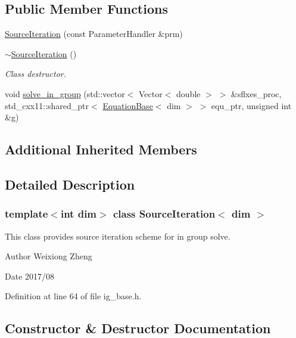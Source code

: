 \subsection*{Public Member Functions}
\begin{DoxyCompactItemize}
\item 
\hyperlink{class_source_iteration_a50f7b38da2b8550f069386606026dc19}{Source\+Iteration} (const Parameter\+Handler \&prm)
\item 
\hyperlink{class_source_iteration_ae18057a8b8501d9e89b08ecfb33ef499}{$\sim$\+Source\+Iteration} ()
\begin{DoxyCompactList}\small\item\em Class destructor. \end{DoxyCompactList}\item 
void \hyperlink{class_source_iteration_a6d726b9a581391cc4164c29f4ccd1ca5}{solve\+\_\+in\+\_\+group} (std\+::vector$<$ Vector$<$ double $>$ $>$ \&sflxes\+\_\+proc, std\+\_\+cxx11\+::shared\+\_\+ptr$<$ \hyperlink{class_equation_base}{Equation\+Base}$<$ dim $>$ $>$ equ\+\_\+ptr, unsigned int \&g)
\end{DoxyCompactItemize}
\subsection*{Additional Inherited Members}


\subsection{Detailed Description}
\subsubsection*{template$<$int dim$>$\newline
class Source\+Iteration$<$ dim $>$}

This class provides source iteration scheme for in group solve. 

\begin{DoxyAuthor}{Author}
Weixiong Zheng 
\end{DoxyAuthor}
\begin{DoxyDate}{Date}
2017/08 
\end{DoxyDate}


Definition at line 64 of file ig\+\_\+base.\+h.



\subsection{Constructor \& Destructor Documentation}
\mbox{\label{class_source_iteration_a50f7b38da2b8550f069386606026dc19}} 
